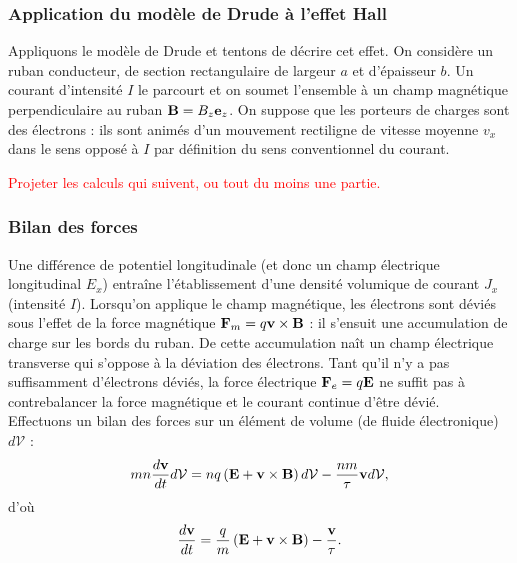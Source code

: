 \documentclass[11pt,a4paper]{report}
\begin{document}
\subsubsection{Application du modèle de Drude à l'effet Hall}

Appliquons le modèle de Drude et tentons de décrire cet effet. On considère un ruban conducteur, de section rectangulaire de largeur $a$ et d'épaisseur $b$. Un courant d'intensité $I$ le parcourt et on soumet l'ensemble à un champ magnétique perpendiculaire au ruban $\bold{B} = B_z\bold{e}_z$. On suppose que les porteurs de charges sont des électrons : ils sont animés d'un mouvement rectiligne de vitesse moyenne $v_x$ dans le sens opposé à $I$ par définition du sens conventionnel du courant.


\textcolor{red}{Projeter les calculs qui suivent, ou tout du moins une partie.}

\subsubsection{Bilan des forces}

Une différence de potentiel longitudinale (et donc un champ électrique longitudinal $E_x$) entraîne l'établissement d'une densité volumique de courant $J_x$ (intensité $I$). Lorsqu'on applique le champ magnétique, les électrons sont déviés sous l'effet de la force magnétique $\bold{F}_m = q\bold{v}\times\bold{B}$ : il s'ensuit une accumulation de charge sur les bords du ruban. De cette accumulation naît un champ électrique transverse qui s'oppose à la déviation des électrons. Tant qu'il n'y a pas suffisamment d'électrons déviés, la force électrique $\bold{F}_e = q\bold{E}$ ne suffit pas à contrebalancer la force magnétique et le courant continue d'être dévié.\\

Effectuons un bilan des forces sur un élément de volume (de fluide électronique) $d\mathcal{V}$ :
\begin{equation}
	m n \frac{d\bold{v}}{dt}d\mathcal{V} = n q \left(\bold{E} + \bold{v}\times\bold{B}\right) d\mathcal{V} - \frac{n m }{\tau} \bold{v} d\mathcal{V},
\end{equation}
d'où
\begin{equation}
	\frac{d\bold{v}}{dt} = \frac{q}{m}\left(\bold{E} + \bold{v}\times\bold{B}\right) - \frac{\bold{v}}{\tau}.
\end{equation}
\end{document}
